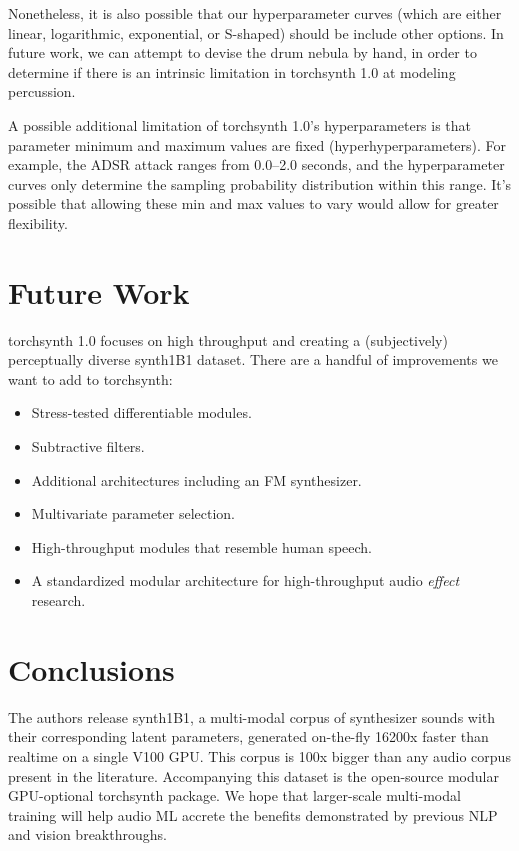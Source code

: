 Nonetheless, it is also possible that our hyperparameter curves (which are either linear, logarithmic, exponential, or S-shaped) should be include other options. In future work, we can attempt to devise the drum nebula by hand, in order to determine if there is an intrinsic limitation in torchsynth 1.0 at modeling percussion.

A possible additional limitation of torchsynth 1.0's hyperparameters is that parameter minimum and maximum values are fixed (hyperhyperparameters). For example, the ADSR attack ranges from 0.0--2.0 seconds, and the hyperparameter curves only determine the sampling probability distribution within this range. It's possible that allowing these min and max values to vary would allow for greater flexibility.
\fi

\section{Future Work}

torchsynth 1.0 focuses on high throughput and creating a (subjectively) perceptually diverse synth1B1 dataset. %
There are a handful of improvements we want to add to torchsynth:
\begin{itemize}
\item Stress-tested differentiable modules.
\item Subtractive filters.
\item Additional architectures including an FM synthesizer.
\item Multivariate parameter selection.
\item High-throughput modules that resemble human speech.
\item A standardized modular architecture for high-throughput audio {\em effect} research.
\end{itemize}


\section{Conclusions}

The authors release synth1B1, a multi-modal corpus of synthesizer sounds with their corresponding latent parameters, generated on-the-fly 16200x faster than realtime on a single V100 GPU. This corpus is 100x bigger than any audio corpus present in the literature. Accompanying this dataset is the open-source modular GPU-optional torchsynth package. We hope that larger-scale multi-modal training will help audio ML accrete the benefits demonstrated by previous NLP and vision breakthroughs.

